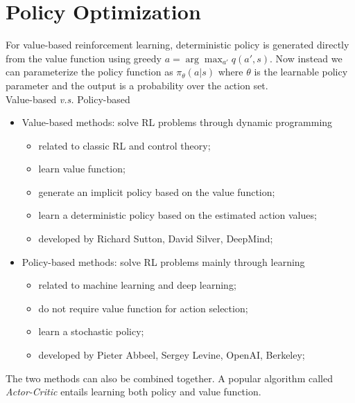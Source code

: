 \documentclass{progartcn}
\begin{document}
	\label{sub:deep_q_networks}
	

\pagebreak
	
\section{Policy Optimization}

	For value-based reinforcement learning, deterministic policy is generated directly from the value function using greedy $a=\arg\max_{a'} q(a',s)$. Now instead we can parameterize the policy function as $\pi_{\theta}(a|s)$ where $\theta$ is the learnable policy parameter and the output is a probability over the action set.\\

	Value-based \textit{v.s.} Policy-based
		\begin{itemize}[noitemsep,topsep=0pt]
			\item Value-based methods: solve RL problems through dynamic programming
			\begin{itemize}[noitemsep,topsep=0pt]
				\item related to classic RL and control theory;
				\item learn value function;
				\item generate an implicit policy based on the value function;
				\item learn a deterministic policy based on the estimated action values;
				\item developed by Richard Sutton, David Silver, DeepMind;
			\end{itemize}
			\item Policy-based methods: solve RL problems mainly through learning
		 	\begin{itemize}[noitemsep,topsep=0pt]
		 		\item related to machine learning and deep learning;
				\item do not require value function for action selection;
				\item learn a stochastic policy;
				\item developed by Pieter Abbeel, Sergey Levine, OpenAI, Berkeley;
			\end{itemize}
		\end{itemize}
	The two methods can also be combined together. A popular algorithm called \textit{Actor-Critic} entails learning both policy and value function.\\
\end{document}
